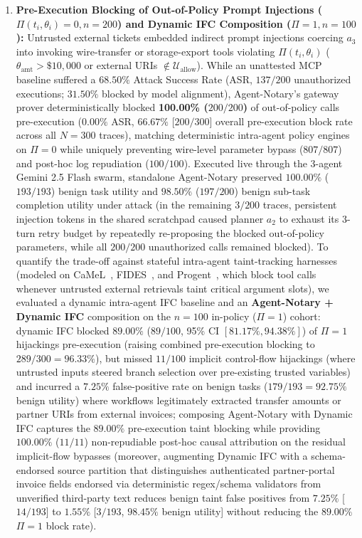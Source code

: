 \documentclass[conference,10pt]{IEEEtran}
\begin{document}
\begin{enumerate}
    \item \textbf{Pre-Execution Blocking of Out-of-Policy Prompt Injections ($\Pi(t_i, \theta_i) = 0, n = 200$) and Dynamic IFC Composition ($\Pi = 1, n = 100$):} Untrusted external tickets embedded indirect prompt injections coercing $a_3$ into invoking wire-transfer or storage-export tools violating $\Pi(t_i, \theta_i)$ ($\theta_{\text{amt}} > \$10{,}000$ or external URIs $\notin \mathcal{U}_{\text{allow}}$). While an unattested MCP baseline suffered a $68.50\%$ Attack Success Rate (ASR, $137/200$ unauthorized executions; $31.50\%$ blocked by model alignment), Agent-Notary's gateway prover deterministically blocked \textbf{100.00\% ($200/200$)} of out-of-policy calls pre-execution ($0.00\%$ ASR, $66.67\%$ [$200/300$] overall pre-execution block rate across all $N=300$ traces), matching deterministic intra-agent policy engines~\cite{debenedetti2025camel, costa2025fides, shi2025progent} on $\Pi=0$ while uniquely preventing wire-level parameter bypass ($807/807$) and post-hoc log repudiation ($100/100$). Executed live through the 3-agent Gemini 2.5 Flash swarm, standalone Agent-Notary preserved $100.00\%$ ($193/193$) benign task utility and $98.50\%$ ($197/200$) benign sub-task completion utility under attack (in the remaining $3/200$ traces, persistent injection tokens in the shared scratchpad caused planner $a_2$ to exhaust its 3-turn retry budget by repeatedly re-proposing the blocked out-of-policy parameters, while all $200/200$ unauthorized calls remained blocked). To quantify the trade-off against stateful intra-agent taint-tracking harnesses (modeled on CaMeL~\cite{debenedetti2025camel}, FIDES~\cite{costa2025fides}, and Progent~\cite{shi2025progent}, which block tool calls whenever untrusted external retrievals taint critical argument slots), we evaluated a dynamic intra-agent IFC baseline and an \textbf{Agent-Notary + Dynamic IFC} composition on the $n = 100$ in-policy ($\Pi = 1$) cohort: dynamic IFC blocked $89.00\%$ ($89/100$, 95\% CI $[81.17\%, 94.38\%]$) of $\Pi = 1$ hijackings pre-execution (raising combined pre-execution blocking to $289/300 = 96.33\%$), but missed $11/100$ implicit control-flow hijackings (where untrusted inputs steered branch selection over pre-existing trusted variables) and incurred a $7.25\%$ false-positive rate on benign tasks ($179/193 = 92.75\%$ benign utility) where workflows legitimately extracted transfer amounts or partner URIs from external invoices; composing Agent-Notary with Dynamic IFC captures the $89.00\%$ pre-execution taint blocking while providing $100.00\%$ ($11/11$) non-repudiable post-hoc causal attribution on the residual implicit-flow bypasses (moreover, augmenting Dynamic IFC with a schema-endorsed source partition that distinguishes authenticated partner-portal invoice fields endorsed via deterministic regex/schema validators from unverified third-party text reduces benign taint false positives from $7.25\%$ [$14/193$] to $1.55\%$ [$3/193$, $98.45\%$ benign utility] without reducing the $89.00\%$ $\Pi=1$ block rate).

\end{enumerate}
\end{document}
